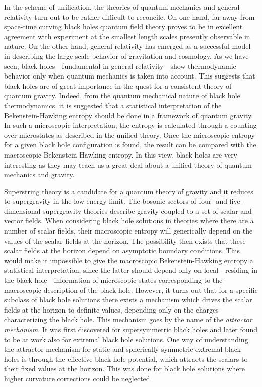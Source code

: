 \documentclass[12pt,twoside]{book}
\begin{document}
In the scheme of unification, the theories of quantum mechanics and general relativity turn out to be rather difficult to reconcile.
On one hand, far away from space-time curving black holes quantum field theory proves to be in excellent agreement with experiment at the smallest length scales presently observable in nature.
On the other hand, general relativity has emerged as a successful model in describing the large scale behavior of gravitation and cosmology.
As we have seen, black holes---fundamental in general relativity---show thermodynamic behavior only when quantum mechanics is taken into account. This suggests that black holes are of great importance in the quest for a consistent theory of quantum gravity. Indeed, from the quantum mechanical nature of black hole thermodynamics, it is suggested that a statistical interpretation of the Bekenstein-Hawking entropy should be done in a framework of quantum gravity. In such a microscopic interpretation, the entropy is calculated through a counting over microstates as described in the unified theory.
Once the microscopic entropy for a given black hole configuration is found, the result can be compared with the macroscopic Bekenstein-Hawking entropy. In this view, black holes are very interesting as they may teach us a great deal about a unified theory of quantum mechanics and gravity.

Superstring theory is a candidate for a quantum theory of gravity and it reduces to  supergravity in the low-energy limit. The bosonic sectors of four- and five-dimensional supergravity theories describe gravity coupled to a set of scalar and vector fields.
When considering black hole solutions in theories where there are a number of scalar fields, their macroscopic entropy will generically depend on the values of the scalar fields at the horizon. 
The possibility then exists that these scalar fields at the horizon depend on asymptotic boundary conditions. This would make it impossible to give the macroscopic Bekenstein-Hawking entropy a statistical interpretation, since the latter should depend only on local---residing in the black hole---information of microscopic states corresponding to the macroscopic description of the black hole. However, it turns out that for a specific subclass of black hole solutions there exists a mechanism which drives the scalar fields at the horizon to definite values, depending only on the charges characterizing the black hole. This mechanism goes by the name of the \emph{attractor mechanism}. It was first discovered for supersymmetric black holes and later found to be at work also for extremal black hole solutions. One way of understanding the attractor mechanism for static and spherically symmetric extremal black holes is through the effective black hole potential, which attracts the scalars to their fixed values at the horizon. This was done for black hole solutions where higher curvature corrections could be neglected.
\end{document}
